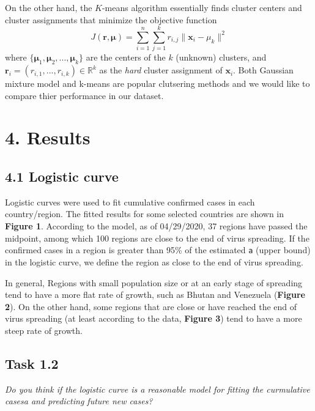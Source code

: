 \documentclass[
]{article}
\begin{document}
On the other hand, the \(K\)-means algorithm essentially finds cluster
centers and cluster assignments that minimize the objective function
\[J(\mathbf r, \boldsymbol \mu) = \sum_{i=1}^n\sum_{j=1}^kr_{i,j}\|\mathbf x_i-\mu_k\|^2\]
where \(\{\boldsymbol \mu_1, \boldsymbol \mu_2,...,\boldsymbol \mu_k\}\)
are the centers of the \(k\) (unknown) clusters, and
\(\mathbf r_i = (r_{i,1},...,r_{i,k})\in \mathbb R^k\) as the
\emph{hard} cluster assignment of \(\mathbf x_i\). Both Gaussian mixture
model and k-means are popular clutsering methods and we would like to
compare thier performance in our dataset.

\hypertarget{results}{%
\section{4. Results}\label{results}}

\hypertarget{logistic-curve}{%
\subsection{4.1 Logistic curve}\label{logistic-curve}}

Logistic curves were used to fit cumulative confirmed cases in each
country/region. The fitted results for some selected countries are shown
in \textbf{Figure 1}. According to the model, as of 04/29/2020, 37
regions have passed the midpoint, among which 100 regions are close to
the end of virus spreading. If the confirmed cases in a region is
greater than 95\% of the estimated \texttt{a} (upper bound) in the
logistic curve, we define the region as close to the end of virus
spreading.

In general, Regions with small population size or at an early stage of
spreading tend to have a more flat rate of growth, such as Bhutan and
Venezuela (\textbf{Figure 2}). On the other hand, some regions that are
close or have reached the end of virus spreading (at least according to
the data, \textbf{Figure 3}) tend to have a more steep rate of growth.

\hypertarget{task-1.2}{%
\subsection{Task 1.2}\label{task-1.2}}

\emph{Do you think if the logistic curve is a reasonable model for
fitting the curmulative casesa and predicting future new cases?}
\end{document}
